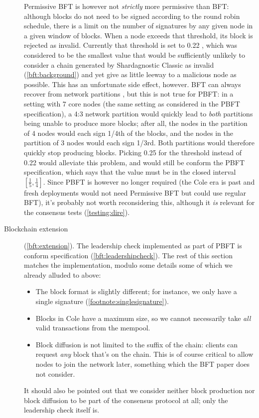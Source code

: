 \begin{description}
  Permissive BFT is however not \emph{strictly} more permissive than BFT:
  although blocks do not need to be signed according to the round robin
  schedule, there is a limit on the number of signatures by any given node in a
  given window of blocks. When a node exceeds that threshold, its block is
  rejected as invalid. Currently that threshold is set to 0.22 \cite[Appendix A,
  Calculating the $t$ parameter]{cole-chain-spec}, which was considered to be
  the smallest value that would be sufficiently unlikely to consider a chain
  generated by Shardagnostic Classic as invalid (\cref{bft:background}) and yet give
  as little leeway to a malicious node as possible. This has an unfortunate side
  effect, however. BFT can always recover from network partitions \cite[Section
  1, Introduction]{cryptoeprint:2018:1049}, but this is not true for PBFT: in a
  setting with 7 core nodes (the same setting as considered in the PBFT
  specification), a 4:3 network partition would quickly lead to \emph{both}
  partitions being unable to produce more blocks; after all, the nodes in the
  partition of 4 nodes would each sign 1/4th of the blocks, and the nodes in the
  partition of 3 nodes would each sign 1/3rd. Both partitions would therefore
  quickly stop producing blocks. Picking 0.25 for the threshold instead of 0.22
  would alleviate this problem, and would still be conform the PBFT
  specification, which says that the value must be in the closed interval
  $[\frac{1}{5}, \frac{1}{4}]$. Since PBFT is however no longer required (the
  Cole era is past and fresh deployments would not need Permissive BFT but
  could use regular BFT), it's probably not worth reconsidering this, although
  it \emph{is} relevant for the consensus tests (\cref{testing:dire}).
%
  \item[Blockchain extension] (\cref{bft:extension}).
  The leadership check implemented as part of PBFT is conform specification
  (\cref{bft:leadershipcheck}). The rest of this section matches the
  implementation, modulo some details some of which we already alluded to above:
%
  \begin{itemize}
    \item The block format is slightly different; for instance, we only have a
    single signature (\cref{footnote:singlesignature}).
    \item Blocks in Cole have a maximum size, so we cannot necessarily take
    \emph{all} valid transactions from the mempool.
    \item Block diffusion is not limited to the suffix of the chain: clients
    can request \emph{any} block that's on the chain. This is of course critical
    to allow nodes to join the network later, something which the BFT paper does
    not consider.
  \end{itemize}
%
  It should also be pointed out that we consider neither block production nor
  block diffusion to be part of the consensus protocol at all; only the
  leadership check itself is.


\end{description}
